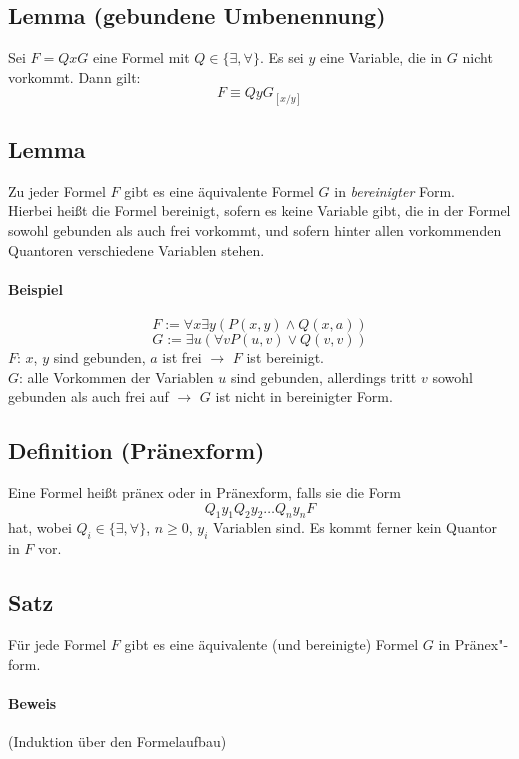 \documentclass[a4paper,twoside,DIV15,BCOR12mm]{scrbook}
\begin{document}
\subsection{Lemma (gebundene Umbenennung)}

Sei $F = QxG$ eine Formel mit $Q\in \{\exists, \forall\}$. Es sei $y$ eine Variable, die in $G$ nicht vorkommt. Dann gilt:
$$F\equiv QyG_{[x/y]}$$

\subsection{Lemma}

Zu jeder Formel $F$ gibt es eine äquivalente Formel $G$ in \emph{bereinigter} Form.\\ Hierbei heißt die Formel bereinigt, sofern es keine Variable gibt, die in der Formel sowohl gebunden als auch frei vorkommt, und sofern hinter allen vorkommenden Quantoren verschiedene Variablen stehen.

\paragraph{Beispiel}

$$F:=\forall x\exists y(P(x,y)\wedge Q(x,a))$$
$$G:=\exists u(\forall vP(u,v)\vee Q(v,v))$$
$F$: $x$, $y$ sind gebunden, $a$ ist frei $\rightarrow$ $F$ ist bereinigt. \\
$G$: alle Vorkommen der Variablen $u$ sind gebunden, allerdings tritt $v$ sowohl gebunden als auch frei auf $\rightarrow$ $G$ ist nicht in bereinigter Form.

\subsection{Definition (Pränexform)}

Eine Formel heißt pränex oder in Pränexform, falls sie die Form $$Q_1y_1Q_2y_2\ldots Q_ny_nF$$ hat, wobei $Q_i\in\{\exists, \forall\}$, $n\geq0$, $y_i$ Variablen sind. Es kommt ferner kein Quantor in $F$ vor.

\subsection{Satz}

Für jede Formel $F$ gibt es eine äquivalente (und bereinigte) Formel $G$ in Pränex"-form.

\paragraph{Beweis} (Induktion über den Formelaufbau)
\end{document}
